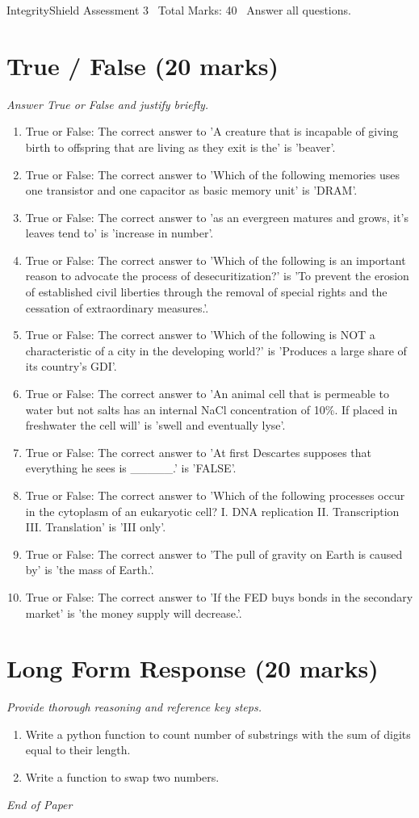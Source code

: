 \documentclass[12pt]{article}
\begin{document}
\begin{center}
IntegrityShield Assessment 3 \
Total Marks: 40 \
Answer all questions.
\end{center}

\section*{True / False (20 marks)}
\textit{Answer True or False and justify briefly.}
\begin{enumerate}[label=\arabic*.]
\item True or False: The correct answer to 'A creature that is incapable of giving birth to offspring that are living as they exit is the' is 'beaver'.
\item True or False: The correct answer to 'Which of the following memories uses one transistor and one capacitor as basic memory unit' is 'DRAM'.
\item True or False: The correct answer to 'as an evergreen matures and grows, it's leaves tend to' is 'increase in number'.
\item True or False: The correct answer to 'Which of the following is an important reason to advocate the process of desecuritization?' is 'To prevent the erosion of established civil liberties through the removal of special rights and the cessation of extraordinary measures.'.
\item True or False: The correct answer to 'Which of the following is NOT a characteristic of a city in the developing world?' is 'Produces a large share of its country's GDI'.
\item True or False: The correct answer to 'An animal cell that is permeable to water but not salts has an internal NaCl concentration of 10\%. If placed in freshwater the cell will' is 'swell and eventually lyse'.
\item True or False: The correct answer to 'At first Descartes supposes that everything he sees is \_\_\_\_\_.' is 'FALSE'.
\item True or False: The correct answer to 'Which of the following processes occur in the cytoplasm of an eukaryotic cell? I. DNA replication II. Transcription III. Translation' is 'III only'.
\item True or False: The correct answer to 'The pull of gravity on Earth is caused by' is 'the mass of Earth.'.
\item True or False: The correct answer to 'If the FED buys bonds in the secondary market' is 'the money supply will decrease.'.
\end{enumerate}

\section*{Long Form Response (20 marks)}
\textit{Provide thorough reasoning and reference key steps.}
\begin{enumerate}[label=\arabic*.]
\item Write a python function to count number of substrings with the sum of digits equal to
their length.
\item Write a function to swap two numbers.
\end{enumerate}

\vfill
\noindent\textit{End of Paper}
\end{document}
